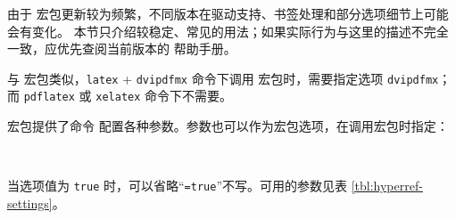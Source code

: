 由于  宏包更新较为频繁，不同版本在驱动支持、书签处理和部分选项细节上可能会有变化。
本节只介绍较稳定、常见的用法；如果实际行为与这里的描述不完全一致，应优先查阅当前版本的  帮助手册。

与  宏包类似，\texttt{latex} + \texttt{dvipdfmx} 命令下调用  宏包时，需要指定选项 \texttt{dvipdfmx}；
而 \texttt{pdflatex} 或 \texttt{xelatex} 命令下不需要。

 宏包提供了命令  配置各种参数。参数也可以作为宏包选项，在调用宏包时指定：
\begin{command}
 \\
\end{command}
当选项值为 \texttt{true} 时，可以省略“\texttt{=true}”不写。可用的参数见表 \ref{tbl:hyperref-settings}。


